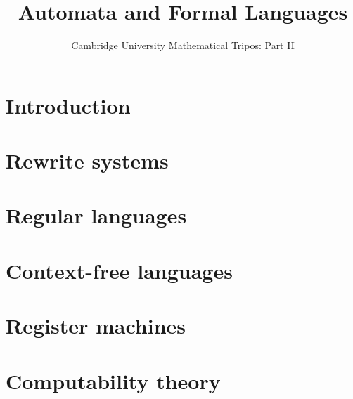\documentclass{article}
\title{Automata and Formal Languages}
\author{Cambridge University Mathematical Tripos: Part II}
\begin{document}
\maketitle

\tableofcontentsnewpage{}

\section{Introduction}

\section{Rewrite systems}

\section{Regular languages}

\section{Context-free languages}

\section{Register machines}

\section{Computability theory}

\end{document}
